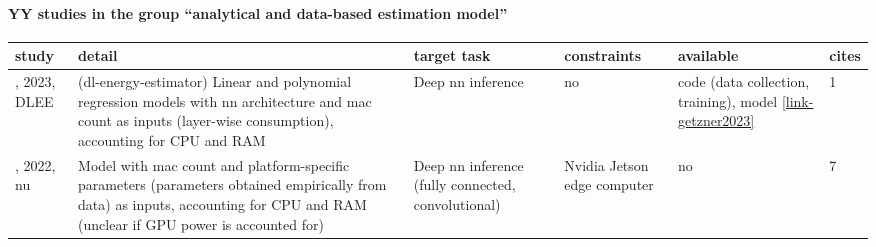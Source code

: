 \paragraph{YY studies in the group ``analytical and data-based estimation model''} 
 \label{tab:YY-analytical-and-data-based-estimation-model} 
\begin{longtable}{|>{\raggedright\arraybackslash}p{2cm}|p{5.9cm}|>{\raggedright\arraybackslash}p{1.85cm}|>{\raggedright\arraybackslash}p{2cm}|>{\raggedright\arraybackslash}p{1.5cm}|p{0.7cm}|}
\toprule
\bfseries study & \bfseries detail & \bfseries target task & \bfseries constraints & \bfseries available & \bfseries cites \\
\midrule 
\endhead
\cite{getzner2023}, 2023, DLEE & (dl-energy-estimator) Linear and polynomial regression models with \acrshort{nn} architecture and \acrshort{mac} count as inputs (layer-wise consumption), accounting for CPU and RAM & Deep \acrshort{nn} inference & no & code (data collection, training), model \href{https://github.com/JohannesGetzner/dl-energy-estimator}{\ref*{link-getzner2023}} & 1 \\
\cite{lahmer2022}, 2022, \acrshort{nu} & Model with \acrshort{mac} count and platform-specific parameters (parameters obtained empirically from data) as inputs, accounting for CPU and RAM (unclear if GPU power is accounted for) & Deep \acrshort{nn} inference (fully connected, convolutional) & Nvidia Jetson edge computer & no & 7 \\
\bottomrule
\end{longtable}
